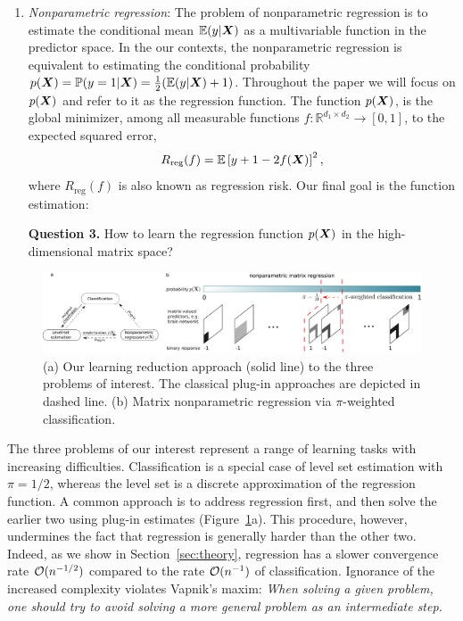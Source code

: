 \documentclass[11pt]{article}
\theoremstyle{definition}
\begin{document}
\begin{enumerate}[label={2.\arabic*},wide, labelwidth=!, labelindent=0pt]
{\bf Question 2.} How to simultaneously estimate the level set and identify important variables in the matrix-valued predictor space, for the goal of interpretable prediction?


\item {\it Nonparametric regression}: The problem of nonparametric regression is to estimate the conditional mean $\mathbb{E}(y|\bm X)$ as a multivariable function in the predictor space. In the our contexts, the nonparametric regression is equivalent to estimating the conditional probability $p(\bm X)=\mathbb{P}(y=1|\bm X)=\frac{1}{2}(\mathbb{E}(y|\bm X)+1)$. Throughout the paper we will focus on $p(\bm X)$ and refer to it as the regression function. 
The function $p(\bm X)$, is the global minimizer, among all measurable functions $f\colon \mathbb{R}^{d_1\times d_2}\to[0,1]$, to the expected squared error,
\begin{equation}\label{eq:regression}
R_{\text{reg}}(f)=\mathbb{E}\left[y+1-2f(\bm X)\right]^2,
\end{equation}
where $R_{\text{reg}}(f)$ is also known as regression risk. Our final goal is the function estimation:

{\bf Question 3.} How to learn the regression function $p(\bm X)$ in the high-dimensional matrix space?
\end{enumerate}


\begin{figure}\centering
\includegraphics[width=1\textwidth]{new_demo.pdf}
\caption{(a) Our learning reduction approach (solid line) to the three problems of interest. The classical plug-in approaches are depicted in dashed line. (b) Matrix nonparametric regression via $\pi$-weighted classification.}\label{fig:diagram}
\end{figure}

The three problems of our interest represent a range of learning tasks with increasing difficulties. Classification is a special case of level set estimation with $\pi=1/2$, whereas the level set is a discrete approximation of the regression function. A common approach is to address regression first, and then solve the earlier two using plug-in estimates (Figure~\ref{fig:diagram}a). This procedure, however, undermines the fact that regression is generally harder than the other two. Indeed, as we show in Section~\ref{sec:theory}, regression has a slower convergence rate $\mathcal{O}(n^{-1/2})$ compared to the rate $\mathcal{O}(n^{-1})$ of classification. Ignorance of the increased complexity violates Vapnik’s maxim: \emph{When solving a given problem, one should try to avoid solving a more general problem as an intermediate step.} 
\end{document}
